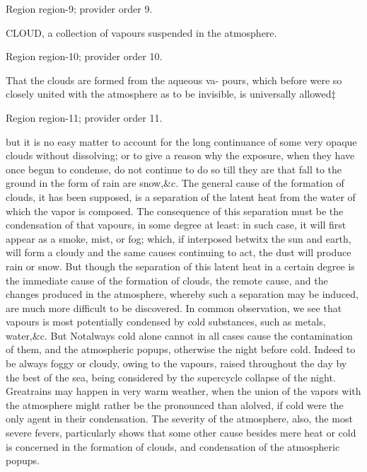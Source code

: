 \documentclass[11pt]{article}
\begin{document}
{\scriptsize\color{gray} Region region-9; provider order 9.\par}
\medskip

CLOUD, a collection of vapours suspended in the atmosphere.
\par

{\scriptsize\color{gray} Region region-10; provider order 10.\par}
\medskip

That the clouds are formed from the aqueous va- pours, which before were so closely united with the atmosphere as to be invisible, is universally allowed‡
\par

{\scriptsize\color{gray} Region region-11; provider order 11.\par}
\medskip

but it is no easy matter to account for the long continuance of some very opaque clouds without dissolving; or to give a reason why the exposure, when they have once begun to condense, do not continue to do so till they are that fall to the ground in the form of rain are snow,\&c. The general cause of the formation of clouds, it has been supposed, is a separation of the latent heat from the water of which the vapor is composed. The consequence of this separation must be the condensation of that vapours, in some degree at least: in such case, it will first appear as a smoke, mist, or fog; which, if interposed betwitx the sun and earth, will form a cloudy and the same causes continuing to act, the dust will produce rain or snow. But though the separation of this latent heat in a certain degree is the immediate cause of the formation of clouds, the remote cause, and the changes produced in the atmosphere, whereby such a separation may be induced, are much more difficult to be discovered. In common observation, we see that vapours is most potentially condensed by cold substances, such as metals, water,\&c. But Notalways cold alone cannot in all cases cause the contamination of them, and the atmospheric popups, otherwise the night before cold. Indeed to be always foggy or cloudy, owing to the vapours, raised throughout the day by the best of the sea, being considered by the supercycle collapse of the night. Greatrains may happen in very warm weather, when the union of the vapors with the atmosphere might rather be the pronounced than alolved, if cold were the only agent in their condensation. The severity of the atmosphere, also, the most severe fevers, particularly shows that some other cause besides mere heat or cold is concerned in the formation of clouds, and condensation of the atmospheric popups.
\par
\end{document}

